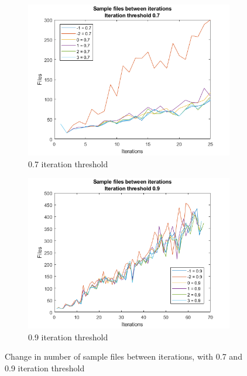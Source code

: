 \begin{figure}
    \centering
    \begin{subfigure}[b]{.49\textwidth}
        \centering
        \includegraphics[width=\textwidth]{figures/iterfiles-0.7.png}
        \caption{0.7 iteration threshold}
        \label{sfig:iter:iterfiles0.7}
    \end{subfigure}
    \hfill
    \begin{subfigure}[b]{.49\textwidth}
        \centering
        \includegraphics[width=\textwidth]{figures/iterfiles-0.9.png}
        \caption{0.9 iteration threshold}
        \label{sfig:iter:iterfiles0.9}
    \end{subfigure}
    \caption{Change in number of sample files between iterations, with 0.7 and 0.9 iteration threshold}
    \label{fig:iter:iterfiles0.70.9}
\end{figure}

